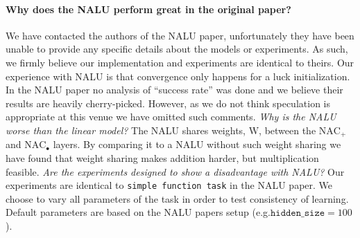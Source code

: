 \documentclass{article}
\begin{document}

\paragraph{Why does the NALU perform great in the original paper?} %
We have contacted the authors of the NALU paper, unfortunately they have been unable to provide any specific details about the models or experiments.
As such, we firmly believe our implementation and experiments are identical to theirs.
Our experience with NALU is that convergence only happens for a luck initialization.
In the NALU paper no analysis of ``success rate'' was done and we believe their results are heavily cherry-picked.
However, as we do not think speculation is appropriate at this venue we have omitted such comments. %
\textit{Why is the NALU worse than the linear model?} The NALU shares weights, $\mathrm{W}$, between the $\mathrm{NAC}_{+}$ and $\mathrm{NAC}_{\bullet}$ layers.
By comparing it to a NALU without such weight sharing we have found that weight sharing makes addition harder, but multiplication feasible. %
\textit{Are the experiments designed to show a disadvantage with NALU?} Our experiments are identical to \texttt{simple function task} in the NALU paper.
We choose to vary all parameters of the task in order to test consistency of learning.
Default parameters are based on the NALU papers setup (e.g.$\texttt{hidden\_size}=100$).
\end{document}
